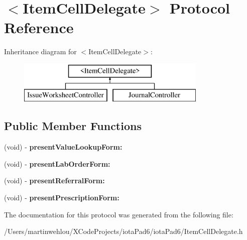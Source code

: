 \hypertarget{protocol_item_cell_delegate-p}{
\section{$<$ItemCellDelegate$>$ Protocol Reference}
\label{protocol_item_cell_delegate-p}
}
Inheritance diagram for $<$ItemCellDelegate$>$:\begin{figure}[H]
\begin{center}
\leavevmode
\includegraphics[height=2.000000cm]{protocol_item_cell_delegate-p}
\end{center}
\end{figure}
\subsection*{Public Member Functions}
\begin{DoxyCompactItemize}
\item 
\hypertarget{protocol_item_cell_delegate-p_af6aee0781824520ba18efa852d5c687a}{
(void) -\/ {\bfseries presentValueLookupForm:}}
\label{protocol_item_cell_delegate-p_af6aee0781824520ba18efa852d5c687a}

\item 
\hypertarget{protocol_item_cell_delegate-p_a65cd1a316eb15af8f6aacf1aa5d83d6e}{
(void) -\/ {\bfseries presentLabOrderForm:}}
\label{protocol_item_cell_delegate-p_a65cd1a316eb15af8f6aacf1aa5d83d6e}

\item 
\hypertarget{protocol_item_cell_delegate-p_ac615fb3c5d1177f964c9214944ae1b86}{
(void) -\/ {\bfseries presentReferralForm:}}
\label{protocol_item_cell_delegate-p_ac615fb3c5d1177f964c9214944ae1b86}

\item 
\hypertarget{protocol_item_cell_delegate-p_a2a59696778b2be23c821841d94409e93}{
(void) -\/ {\bfseries presentPrescriptionForm:}}
\label{protocol_item_cell_delegate-p_a2a59696778b2be23c821841d94409e93}

\end{DoxyCompactItemize}


The documentation for this protocol was generated from the following file:\begin{DoxyCompactItemize}
\item 
/Users/martinwehlou/XCodeProjects/iotaPad6/iotaPad6/ItemCellDelegate.h\end{DoxyCompactItemize}
